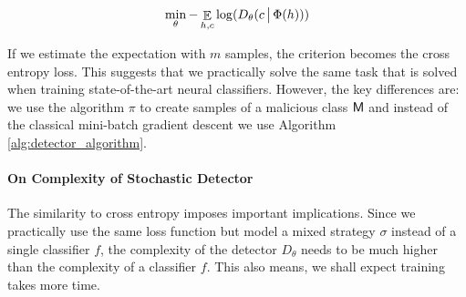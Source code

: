 \begin{equation}
    \min_\theta - \mathop{\mathbb{E}}_{h,c} \log(D_\theta (c \,\big|\, \Phi(h)))
\end{equation}

If we estimate the expectation with $m$ samples, the criterion becomes the cross entropy loss. This suggests that we practically solve the same task that is solved when training state-of-the-art neural classifiers. However, the key differences are: we use the algorithm $\pi$ to create samples of a malicious class $\mathsf{M}$ and instead of the classical mini-batch gradient descent \cite{minibatch_descent} we use Algorithm \ref{alg:detector_algorithm}.

\paragraph{On Complexity of Stochastic Detector}
The similarity to cross entropy imposes important implications. Since we practically use the same loss function but model a mixed strategy $\sigma$ instead of a single classifier $f$, the complexity of the detector $D_\theta$ needs to be much higher than the complexity of a classifier $f$. This also means, we shall expect training takes more time.
